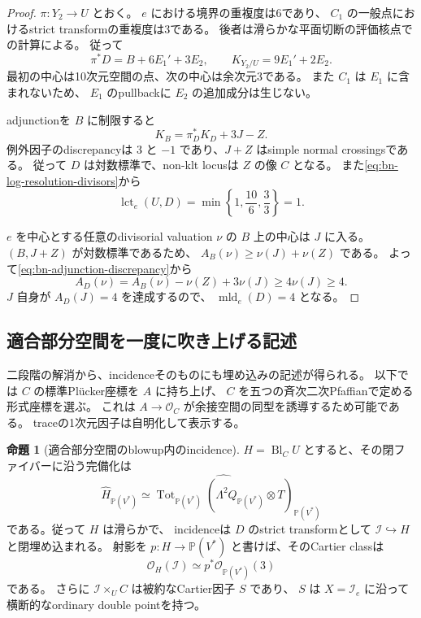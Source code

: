 \documentclass[a4paper,11pt]{ltjsarticle}
\theoremstyle{definition}
\newtheorem{theorem}{命題}[section]
\newcommand{\OO}{\mathcal O}
\newcommand{\PP}{\mathbb P}
\begin{document}
\begin{proof}
$\pi:Y_2\to U$ とおく。
$e$ における境界の重複度は6であり、
$C_1$ の一般点におけるstrict transformの重複度は3である。
後者は滑らかな平面切断の評価核点での計算による。
従って
\begin{equation}\label{eq:bn-log-resolution-divisors}
 \pi^*D=B+6E_1'+3E_2,\qquad K_{Y_2/U}=9E_1'+2E_2.
\end{equation}
最初の中心は10次元空間の点、次の中心は余次元3である。
また $C_1$ は $E_1$ に含まれないため、
$E_1$ のpullbackに $E_2$ の追加成分は生じない。

adjunctionを $B$ に制限すると
\begin{equation}\label{eq:bn-adjunction-discrepancy}
 K_B=\pi_D^*K_D+3J-Z.
\end{equation}
例外因子のdiscrepancyは $3$ と $-1$ であり、$J+Z$ はsimple normal crossingsである。
従って $D$ は対数標準で、non-klt locusは $Z$ の像 $C$ となる。
また\eqref{eq:bn-log-resolution-divisors}から
\[
 \operatorname{lct}_e(U,D)
 =\min\left\{1,\frac{10}{6},\frac{3}{3}\right\}=1.
\]

$e$ を中心とする任意のdivisorial valuation $\nu$ の $B$ 上の中心は $J$ に入る。
$(B,J+Z)$ が対数標準であるため、
$A_B(\nu)\ge\nu(J)+\nu(Z)$ である。
よって\eqref{eq:bn-adjunction-discrepancy}から
\[
 A_D(\nu)=A_B(\nu)-\nu(Z)+3\nu(J)\ge4\nu(J)\ge4.
\]
$J$ 自身が $A_D(J)=4$ を達成するので、
$\operatorname{mld}_e(D)=4$ となる。
\end{proof}

\subsection{適合部分空間を一度に吹き上げる記述}

二段階の解消から、incidenceそのものにも埋め込みの記述が得られる。
以下では $C$ の標準Pl\"ucker座標を $A$ に持ち上げ、
$C$ を五つの斉次二次Pfaffianで定める形式座標を選ぶ。
これは $A\to\OO_C$ が余接空間の同型を誘導するため可能である。
traceの1次元因子は自明化して表示する。

\begin{theorem}[適合部分空間のblowup内のincidence]\label{thm:bn-single-blowup}
$H=\operatorname{Bl}_C U$ とすると、その閉ファイバーに沿う完備化は
\[
 \widehat H_{\PP(V^*)}
 \simeq
 \widehat{\operatorname{Tot}_{\PP(V^*)}
        (\Lambda^2Q_{\PP(V^*)}\otimes T)}_{\PP(V^*)}
\]
である。従って $H$ は滑らかで、
incidenceは $D$ のstrict transformとして $\mathcal I\hookrightarrow H$
と閉埋め込まれる。
射影を $p:H\to\PP(V^*)$ と書けば、そのCartier classは
\[
 \OO_H(\mathcal I)\simeq p^*\OO_{\PP(V^*)}(3)
\]
である。
さらに $\mathcal I\times_U C$ は被約なCartier因子 $S$ であり、
$S$ は $X=\mathcal I_e$ に沿って横断的なordinary double pointを持つ。
\end{theorem}
\end{document}
